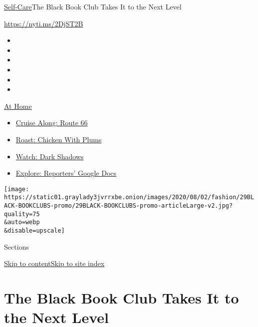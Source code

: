 \href{/section/style/self-care/}{Self-Care}\textbar{}The Black Book Club
Takes It to the Next Level

\url{https://nyti.ms/2DjST2B}

\begin{itemize}
\item
\item
\item
\item
\item
\item
\end{itemize}

\href{https://www.nytimes3xbfgragh.onion/spotlight/at-home?action=click\&pgtype=Article\&state=default\&region=TOP_BANNER\&context=at_home_menu}{At
Home}

\begin{itemize}
\tightlist
\item
  \href{https://www.nytimes3xbfgragh.onion/2020/09/07/travel/route-66.html?action=click\&pgtype=Article\&state=default\&region=TOP_BANNER\&context=at_home_menu}{Cruise
  Along: Route 66}
\item
  \href{https://www.nytimes3xbfgragh.onion/2020/09/04/dining/sheet-pan-chicken.html?action=click\&pgtype=Article\&state=default\&region=TOP_BANNER\&context=at_home_menu}{Roast:
  Chicken With Plums}
\item
  \href{https://www.nytimes3xbfgragh.onion/2020/09/04/arts/television/dark-shadows-stream.html?action=click\&pgtype=Article\&state=default\&region=TOP_BANNER\&context=at_home_menu}{Watch:
  Dark Shadows}
\item
  \href{https://www.nytimes3xbfgragh.onion/interactive/2020/at-home/even-more-reporters-editors-diaries-lists-recommendations.html?action=click\&pgtype=Article\&state=default\&region=TOP_BANNER\&context=at_home_menu}{Explore:
  Reporters' Google Docs}
\end{itemize}

\texttt{[image: https://static01.graylady3jvrrxbe.onion/images/2020/08/02/fashion/29BLACK-BOOKCLUBS-promo/29BLACK-BOOKCLUBS-promo-articleLarge-v2.jpg?quality=75\\\&auto=webp\\\&disable=upscale]}

Sections

\protect\hyperlink{site-content}{Skip to
content}\protect\hyperlink{site-index}{Skip to site index}

\hypertarget{the-black-book-club-takes-it-to-the-next-level}{%
\section{The Black Book Club Takes It to the Next
Level}\label{the-black-book-club-takes-it-to-the-next-level}}

